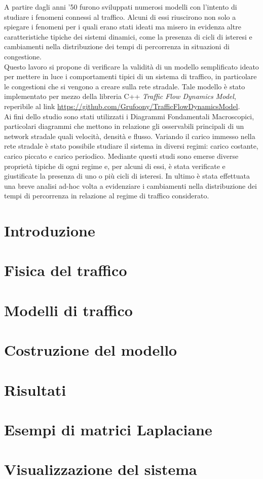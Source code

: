 \documentclass[12pt,a4paper]{report}
\begin{document}
A partire dagli anni '50 furono sviluppati numerosi modelli con l'intento di studiare i fenomeni connessi al traffico.
Alcuni di essi riuscirono non solo a spiegare i fenomeni per i quali erano stati ideati ma misero in evidenza altre caratteristiche tipiche dei sistemi dinamici, come la presenza di cicli di isteresi e cambiamenti nella distribuzione dei tempi di percorrenza in situazioni di congestione.\\
Questo lavoro si propone di verificare la validit\`a di un modello semplificato ideato per mettere in luce i comportamenti tipici di un sistema di traffico, in particolare le congestioni che si vengono a creare sulla rete stradale.
Tale modello \`e stato implementato per mezzo della libreria C++ \emph{Traffic Flow Dynamics Model}, reperibile al link \url{https://github.com/Grufoony/TrafficFlowDynamicsModel}.\\
Ai fini dello studio sono stati utilizzati i Diagrammi Fondamentali Macroscopici, particolari diagrammi che mettono in relazione gli osservabili principali di un network stradale quali velocit\`a, densit\`a e flusso.
Variando il carico immesso nella rete stradale \`e stato possibile studiare il sistema in diversi regimi: carico costante, carico piccato e carico periodico.
Mediante questi studi sono emerse diverse propriet\`a tipiche di ogni regime e, per alcuni di essi, \`e stata verificate e giustificate la presenza di uno o pi\`u cicli di isteresi.
In ultimo \`e stata effettuata una breve analisi ad-hoc volta a evidenziare i cambiamenti nella distribuzione dei tempi di percorrenza in relazione al regime di traffico considerato.

\tableofcontents
\listoffigures

\chapter*{Introduzione}


\chapter{Fisica del traffico}


\chapter{Modelli di traffico}


\chapter{Costruzione del modello}


\chapter{Risultati}


\appendix

\chapter{Esempi di matrici Laplaciane}
\label{appendix:laplacian}

\chapter{Visualizzazione del sistema}
\label{appendix:visual}


\printbibliography
\end{document}
